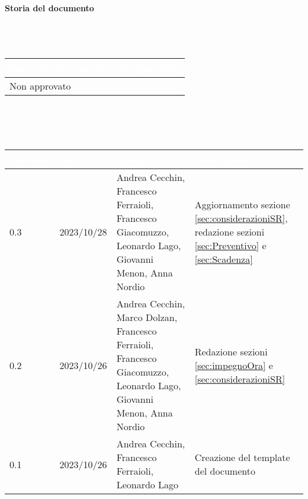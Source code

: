 \documentclass[12pt]{article}
\begin{document}
\begin{huge}
    \textbf{Storia del documento} \\ \\ \\ \\
\end{huge}
\begingroup
\setlength{\tabcolsep}{10pt}
\renewcommand{\arraystretch}{1.5}
\begin{tabularx}{\textwidth}{| X | X |}
    \hline
    \rowcolor{headerrow} \textbf{\textcolor{white}{Stato del documento}} & \textbf{\textcolor{white}{Responsabile}} \\
    \hline
    Non approvato & \\
    \hline
\end{tabularx}
\\ \\ \\
\begin{tabularx}{\textwidth}{| l | l | X | X |}
    \hline
    \rowcolor{headerrow} \textbf{\textcolor{white}{Versione}} & \textbf{\textcolor{white}{Data}} & \textbf{\textcolor{white}{Autori}} & \textbf{\textcolor{white}{Descrizione}} \\
    \hline
    0.3 & 2023/10/28 & Andrea Cecchin, Francesco Ferraioli, Francesco Giacomuzzo, Leonardo Lago, Giovanni Menon, Anna Nordio & Aggiornamento sezione \ref{sec:considerazioniSR}, redazione sezioni \ref{sec:Preventivo} e \ref{sec:Scadenza} \\
    \hline
    0.2 & 2023/10/26 & Andrea Cecchin, Marco Dolzan, Francesco Ferraioli, Francesco Giacomuzzo, Leonardo Lago, Giovanni Menon, Anna Nordio & Redazione sezioni \ref{sec:impegnoOra} e \ref{sec:considerazioniSR} \\
    \hline
    0.1 & 2023/10/26 &  Andrea Cecchin, Francesco Ferraioli, Leonardo Lago & Creazione del template del documento\\
    \hline
\end{tabularx}
\endgroup

\cleardoublepage
\endgroup
\end{document}
